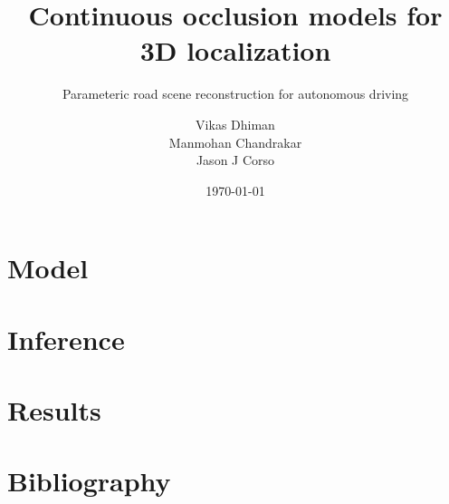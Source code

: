 



\title{Continuous occlusion models for 3D localization}
\subtitle{Parameteric road scene reconstruction for autonomous driving}
\date{\today}
\author{Vikas Dhiman\\ Manmohan Chandrakar\\ Jason J Corso}

%



\maketitle





\section{Model}


\section{Inference}

\section{Results}


\section{Bibliography}
\begin{frame}


\end{frame}


